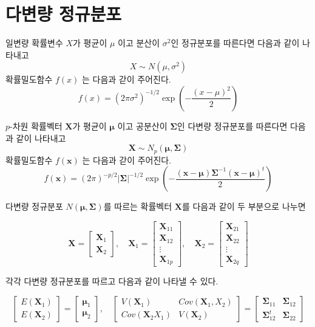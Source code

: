 \documentclass[
  10pt,
]{book}
\theoremstyle{definition}
\theoremstyle{definition}
\theoremstyle{definition}
\theoremstyle{definition}
\theoremstyle{remark}
\begin{document}
\hypertarget{uxb2e4uxbcc0uxb7c9-uxc815uxaddcuxbd84uxd3ec}{%
\section{다변량 정규분포}\label{uxb2e4uxbcc0uxb7c9-uxc815uxaddcuxbd84uxd3ec}}

일변량 확률변수 \(X\)가 평균이 \(\mu\) 이고 분산이 \(\sigma^2\)인 정규분포를 따른다면 다음과 같이 나타내고 \[ X \sim N(\mu, \sigma^2 ) \]
확률밀도함수 \(f(x)\) 는 다음과 갇이 주어진다.
\[ f(x) = (2 \pi \sigma^2)^{-1/2} \exp \left ( - \frac{(x-\mu)^2}{2} \right ) \]

\(p\)-차원 확률벡터 \(\bm X\)가 평균이 \(\bm \mu\) 이고 공분산이 \(\bm \Sigma\)인
다변량 정규분포를 따른다면 다음과 같이 나타내고 \[ \bm X \sim N_p(\bm \mu, \bm \Sigma ) \]
확률밀도함수 \(f(\bm x)\) 는 다음과 갇이 주어진다.
\[ f(\bm x) = (2 \pi)^{-p/2} | \bm \Sigma|^{-1/2} 
   \exp \left ( - \frac{(\bm x-\bm \mu) \bm \Sigma^{-1}(\bm x-\bm \mu)^t}{2} \right ) \]

다변량 정규분포 \(N(\bm \mu, \bm \Sigma)\)를 따르는 확률벡터 \(\bm X\)를 다음과 같이 두 부분으로 나누면

\[ 
  \bm X = 
    \begin{bmatrix}
  \bm X_1 \\
  \bm X_2
  \end{bmatrix}, \quad
  \bm X_1 = 
    \begin{bmatrix}
  \bm X_{11} \\
  \bm X_{12} \\
  \bm \vdots \\
  \bm X_{1p}
  \end{bmatrix}, \quad 
  \bm X_2= 
    \begin{bmatrix}
  \bm X_{21} \\
  \bm X_{22} \\
  \bm \vdots \\
  \bm X_{2q}
  \end{bmatrix}
  \]

각각 다변량 정규분포를 따르고 다음과 같이 나타낼 수 있다.

\[ 
  \begin{bmatrix}
  E(\bm X_1) \\
  E(\bm X_2)
  \end{bmatrix}
  =
    \begin{bmatrix}
  \bm \mu_1 \\
  \bm \mu_2
  \end{bmatrix}
  , \quad 
  \begin{bmatrix}
  V(\bm X_1) & Cov(\bm X_1, X_2) \\
  Cov(\bm X_2 X_1) & V(\bm X_2)
  \end{bmatrix}
  =
    \begin{bmatrix}
  \bm \Sigma_{11} & \bm \Sigma_{12} \\
  \bm \Sigma^t_{12} & \bm \Sigma_{22}
  \end{bmatrix}
  \]
\end{document}
